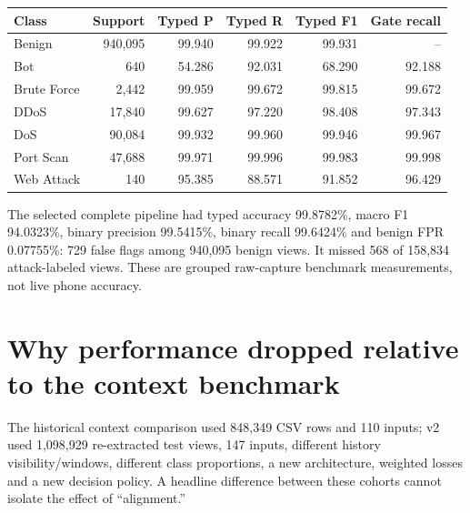 \documentclass[11pt,a4paper,oneside]{report}
\begin{document}
{\small
\begin{longtable}{@{}lrrrrr@{}}
\toprule
Class & Support & Typed P & Typed R & Typed F1 & Gate recall\\\midrule\endhead
Benign & 940,095 & 99.940 & 99.922 & 99.931 & --\\
Bot & 640 & 54.286 & 92.031 & 68.290 & 92.188\\
Brute Force & 2,442 & 99.959 & 99.672 & 99.815 & 99.672\\
DDoS & 17,840 & 99.627 & 97.220 & 98.408 & 97.343\\
DoS & 90,084 & 99.932 & 99.960 & 99.946 & 99.967\\
Port Scan & 47,688 & 99.971 & 99.996 & 99.983 & 99.998\\
Web Attack & 140 & 95.385 & 88.571 & 91.852 & 96.429\\
\bottomrule\end{longtable}
}

The selected complete pipeline had typed accuracy 99.8782\%, macro F1 94.0323\%, binary precision 99.5415\%, binary recall 99.6424\% and benign FPR 0.07755\%: 729 false flags among 940,095 benign views. It missed 568 of 158,834 attack-labeled views. These are grouped raw-capture benchmark measurements, not live phone accuracy.

\section{Why performance dropped relative to the context benchmark}
The historical context comparison used 848,349 CSV rows and 110 inputs; v2 used 1,098,929 re-extracted test views, 147 inputs, different history visibility/windows, different class proportions, a new architecture, weighted losses and a new decision policy. A headline difference between these cohorts cannot isolate the effect of ``alignment.''
\end{document}
